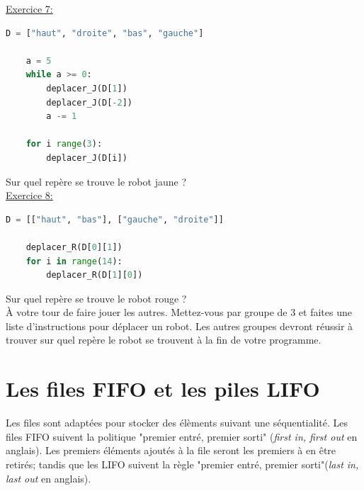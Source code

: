 \underline{Exercice 7:}
\begin{lstlisting}[language=Python]
    D = ["haut", "droite", "bas", "gauche"]

    a = 5
    while a >= 0:
        deplacer_J(D[1])
        deplacer_J(D[-2])
        a -= 1

    for i range(3):
        deplacer_J(D[i])
\end{lstlisting}
Sur quel repère se trouve le robot jaune ?\\

\underline{Exercice 8:}
\begin{lstlisting}[language=Python]
    D = [["haut", "bas"], ["gauche", "droite"]]

    deplacer_R(D[0][1])
    for i in range(14):
        deplacer_R(D[1][0])
\end{lstlisting}
Sur quel repère se trouve le robot rouge ?\\

À votre tour de faire jouer les autres. Mettez-vous par groupe de 3 et faites une liste d'instructions pour déplacer un robot. Les autres groupes devront réussir à trouver sur quel repère le robot se trouvent à la fin de votre programme.


\newpage
\section{Les files FIFO et les piles LIFO}

Les files sont adaptées pour stocker des élèments suivant une séquentialité. Les files FIFO suivent la politique "premier entré, premier sorti" (\textit{first in, first out} en anglais). Les premiers éléments ajoutés à la file seront les premiers à en être retirés; tandis que les LIFO suivent la règle "premier entré, premier sorti"(\textit{last in, last out} en anglais).\\

